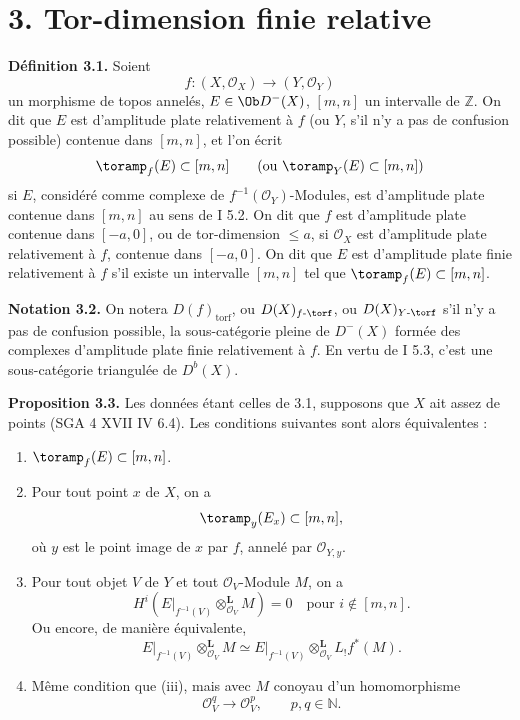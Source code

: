 \documentclass[11pt]{article}
\begin{document}
\section*{3. Tor-dimension finie relative}

\textbf{Définition 3.1.} Soient
\[
  f:(X,\mathcal O_X)\longrightarrow(Y,\mathcal O_Y)
\]
un morphisme de topos annelés, \(E\in\Ob D^{-}(X)\), \([m,n]\) un intervalle de \(\mathbb Z\). On dit que \(E\) est d'amplitude plate relativement à \(f\) (ou \(Y\), s'il n'y a pas de confusion possible) contenue dans \([m,n]\), et l'on écrit
\[
  \toramp_f(E)\subset[m,n]\qquad(\text{ou }\toramp_Y(E)\subset[m,n])
\]
si \(E\), considéré comme complexe de \(f^{-1}(\mathcal O_Y)\)-Modules, est d'amplitude plate contenue dans \([m,n]\) au sens de I 5.2. On dit que \(f\) est d'amplitude plate contenue dans \([-a,0]\), ou de tor-dimension \(\leq a\), si \(\mathcal O_X\) est d'amplitude plate relativement à \(f\), contenue dans \([-a,0]\). On dit que \(E\) est d'amplitude plate finie relativement à \(f\) s'il existe un intervalle \([m,n]\) tel que \(\toramp_f(E)\subset[m,n]\).

\textbf{Notation 3.2.} On notera \(D(f)_{\mathrm{torf}}\), ou \(D(X)_{f\text{-}\torf}\), ou \(D(X)_{Y\text{-}\torf}\) s'il n'y a pas de confusion possible, la sous-catégorie pleine de \(D^{-}(X)\) formée des complexes d'amplitude plate finie relativement à \(f\). En vertu de I 5.3, c'est une sous-catégorie triangulée de \(D^b(X)\).

\textbf{Proposition 3.3.} Les données étant celles de 3.1, supposons que \(X\) ait assez de points (SGA 4 XVII IV 6.4). Les conditions suivantes sont alors équivalentes :
\begin{enumerate}[label=(\roman*)]
\item \(\toramp_f(E)\subset[m,n]\).
\item Pour tout point \(x\) de \(X\), on a
\[
  \toramp_y(E_x)\subset[m,n],
\]
où \(y\) est le point image de \(x\) par \(f\), annelé par \(\mathcal O_{Y,y}\).
\item Pour tout objet \(V\) de \(Y\) et tout \(\mathcal O_V\)-Module \(M\), on a
\[
  H^i\left(E\vert_{f^{-1}(V)}\otimes_{\mathcal O_V}^{\mathbf L}M\right)=0
  \quad\text{pour }i\notin[m,n].
\]
Ou encore, de manière équivalente,
\[
  E\vert_{f^{-1}(V)}\otimes_{\mathcal O_V}^{\mathbf L}M
  \simeq E\vert_{f^{-1}(V)}\otimes_{\mathcal O_V}^{\mathbf L}L_!f^*(M).
\]
\item Même condition que (iii), mais avec \(M\) conoyau d'un homomorphisme
\[
  \mathcal O_V^q\longrightarrow \mathcal O_V^p,
  \qquad p,q\in\mathbb N.
\]
\end{enumerate}
\end{document}
